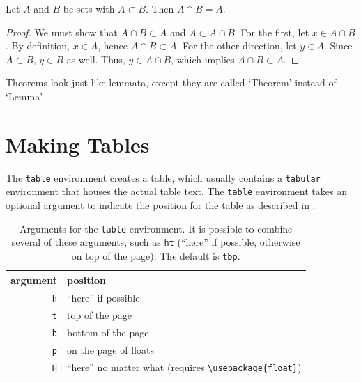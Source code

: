 \begin{lemma}
\label{lemma:example}

Let $A$ and $B$ be sets with $A \subset B$.
Then $A\cap B = A$.

\begin{proof}
We must show that $A\cap B \subset A$ and $A \subset A \cap B$.
For the first, let $x \in A \cap B$.
By definition, $x \in A$, hence $A \cap B \subset A$.
For the other direction, let $y \in A$. Since $A \subset B$, $y \in B$ as well.
Thus, $y \in A \cap B$, which implies $A\cap B \subset A$.
\end{proof}
\end{lemma}

\begin{theorem}
\label{thm:example}
Theorems look just like lemmata, except they are called `Theorem' instead of `Lemma'.
\end{theorem}

\section{Making Tables} %

The \verb"table" environment creates a table, which usually contains a \verb"tabular" environment that houses the actual table text.
The \verb"table" environment takes an optional argument to indicate the position for the table as described in .
%
%


\begin{table}[ht]
\centering
\begin{tabular}{r|l}
    argument & position
    \\ \hline
    \texttt{h} & ``here'' if possible \\
    \texttt{t} & top of the page \\
    \texttt{b} & bottom of the page \\
    \texttt{p} & on the page of floats \\
    \texttt{H} & ``here'' no matter what (requires \verb"\usepackage{float}")
\end{tabular}
\caption[Arguments for the \texttt{table} environment.]{
    Arguments for the \texttt{table} environment. It is possible to combine several of these arguments, such as \texttt{ht} (``here'' if possible, otherwise on top of the page). The default is \texttt{tbp}.
}
\label{table:positions}
\end{table}

